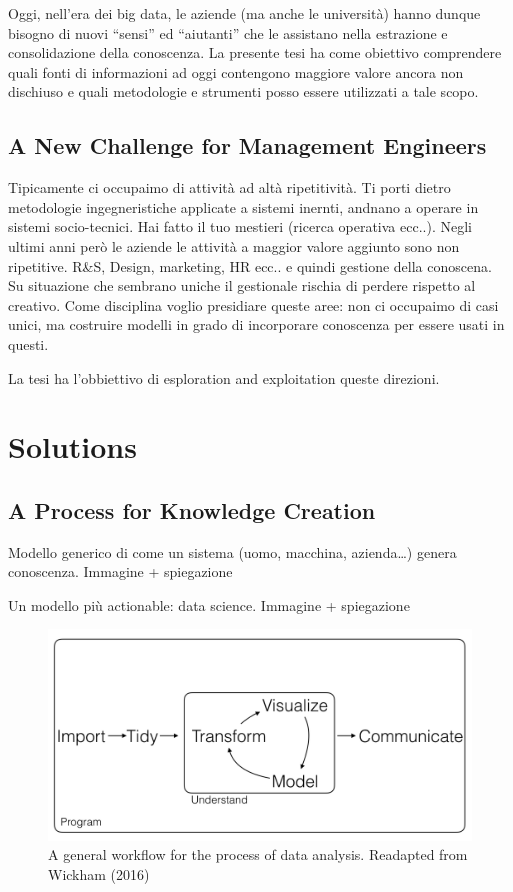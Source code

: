 \documentclass[]{book}
\begin{document}
Oggi, nell'era dei big data, le aziende (ma anche le università) hanno
dunque bisogno di nuovi ``sensi'' ed ``aiutanti'' che le assistano nella
estrazione e consolidazione della conoscenza. La presente tesi ha come
obiettivo comprendere quali fonti di informazioni ad oggi contengono
maggiore valore ancora non dischiuso e quali metodologie e strumenti
posso essere utilizzati a tale scopo.

\section{A New Challenge for Management
Engineers}\label{a-new-challenge-for-management-engineers}

Tipicamente ci occupaimo di attività ad altà ripetitività. Ti porti
dietro metodologie ingegneristiche applicate a sistemi inernti, andnano
a operare in sistemi socio-tecnici. Hai fatto il tuo mestieri (ricerca
operativa ecc..). Negli ultimi anni però le aziende le attività a
maggior valore aggiunto sono non ripetitive. R\&S, Design, marketing, HR
ecc.. e quindi gestione della conoscena. Su situazione che sembrano
uniche il gestionale rischia di perdere rispetto al creativo. Come
disciplina voglio presidiare queste aree: non ci occupaimo di casi
unici, ma costruire modelli in grado di incorporare conoscenza per
essere usati in questi.

La tesi ha l'obbiettivo di esploration and exploitation queste
direzioni.

\chapter{Solutions}\label{solutions}

\section{A Process for Knowledge
Creation}\label{a-process-for-knowledge-creation}

Modello generico di come un sistema (uomo, macchina, azienda\ldots{})
genera conoscenza. Immagine + spiegazione

Un modello più actionable: data science. Immagine + spiegazione

\begin{figure}

{\centering \includegraphics[width=0.8\linewidth]{_bookdown_files/figures/main_work_flow} 

}

\caption{A general workflow for the process of data analysis. Readapted from Wickham (2016)}\label{fig:mainworkflow}
\end{figure}
\end{document}
